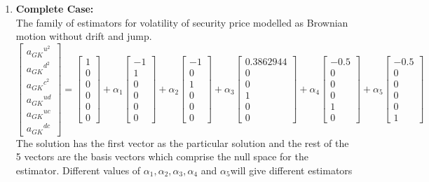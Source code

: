 \documentclass[12pt]{article}   	%
\begin{document}
\begin{enumerate}
\item \textbf{Complete Case:}\\
The family of estimators for volatility of security price modelled as Brownian motion without drift and jump.
$$\begin{bmatrix}
{a_{GK}}^{u^2}\\
{a_{GK}}^{d^2}\\
{a_{GK}}^{c^2}\\
{a_{GK}}^{ud}\\
{a_{GK}}^{uc}\\
{a_{GK}}^{dc}
\end{bmatrix}=
\begin{bmatrix}
1\\
0\\
0\\
0\\
0\\
0
\end{bmatrix}+\alpha_1
\begin{bmatrix}
-1\\
1\\
0\\
0\\
0\\
0
\end{bmatrix}+\alpha_2
\begin{bmatrix}
-1\\
0\\
1\\
0\\
0\\
0
\end{bmatrix}
+\alpha_3
\begin{bmatrix}
0.3862944\\
0\\
0\\
1\\
0\\
0
\end{bmatrix}
+\alpha_4
\begin{bmatrix}
-0.5\\
0\\
0\\
0\\
1\\
0
\end{bmatrix}
+\alpha_5
\begin{bmatrix}
-0.5\\
0\\
0\\
0\\
0\\
1
\end{bmatrix}
 $$
 The solution has the first vector as the particular solution and the rest of the 5 vectors are the basis vectors which comprise the null space for the estimator. Different values of $\alpha_1,\alpha_2, \alpha_3, \alpha_4 $ and $\alpha_5 $will give different estimators\\
 

\end{enumerate}
\end{document}

